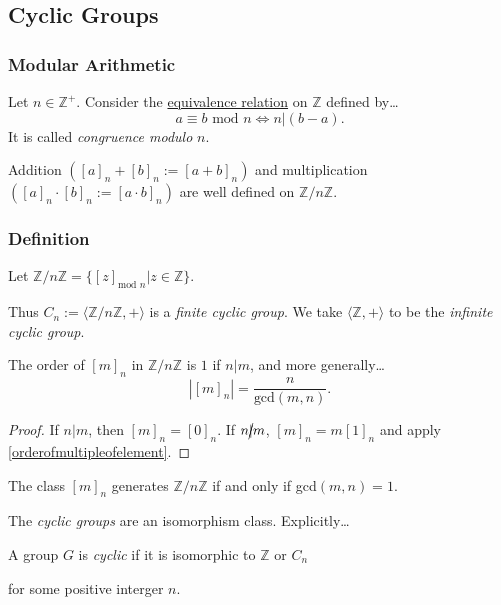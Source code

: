 \subsection{Cyclic Groups}\label{cyclicgroups}

\subsubsection{Modular Arithmetic}\label{modular arithmetic}
Let $n \in \mathbb{Z}^+$. Consider the \hyperref[equivalencerelation]{equivalence relation} on $\mathbb{Z}$ defined by\dots
$$a \equiv b \textrm{ mod } n \Leftrightarrow n | (b-a).$$
It is called \emph{congruence modulo} $n$.

\begin{lemma}
Addition $([a]_n + [b]_n := [a+b]_n)$ and multiplication $([a]_n \cdot [b]_n := [a \cdot b]_n)$ are well defined on $\mathbb{Z} / n \mathbb{Z}$.
\end{lemma}

\subsubsection{Definition}
Let $\mathbb{Z} / n \mathbb{Z} = \{[z]_{\textrm{mod } n} | z \in \mathbb{Z} \}.$\newline

\noindent Thus $C_n := \langle \mathbb{Z} / n \mathbb{Z}, + \rangle$ is a \emph{finite cyclic group}. We take $\langle \mathbb{Z},+ \rangle$ to be the \emph{infinite cyclic group}.

\begin{proposition}
The order of $[m]_n$ in $\mathbb{Z} / n \mathbb{Z}$ is $1$ if $n | m$, and more generally\dots
$$|[m]_n| = \frac{n}{\textrm{gcd}(m,n)}.$$
\end{proposition}

\begin{proof}
If $n | m$, then $[m]_n = [0]_n$. If $n \cancel{|} m$, $[m]_n = m[1]_n$ and apply \ref{orderofmultipleofelement}.
\end{proof}

\begin{corollary}
The class $[m]_n$ generates $\mathbb{Z} / n \mathbb{Z}$ if and only if gcd$(m,n) = 1$.
\end{corollary}

\noindent The \emph{cyclic groups} are an isomorphism class. Explicitly\dots
\begin{center}
A group $G$ is \emph{cyclic} if it is isomorphic to $\mathbb{Z}$ or $C_n$

for some positive interger $n$.
\end{center}


